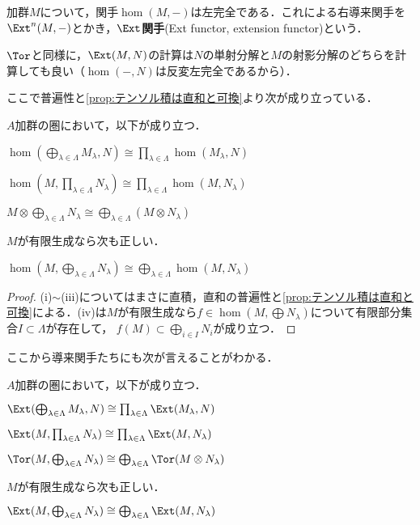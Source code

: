 \begin{defi}[$\Ext$関手]
	加群$M$について，関手$\hom(M,-)$は左完全である．これによる右導来関手を$\Ext^n(M,-)$とかき，$\Ext$\textbf{関手}(Ext functor, extension functor)という．
\end{defi}

$\Tor$と同様に，$\Ext(M,N)$の計算は$N$の単射分解と$M$の射影分解のどちらを計算しても良い（$\hom(-,N)$は反変左完全であるから）．

ここで普遍性と\ref{prop:テンソル積は直和と可換}より次が成り立っている．

\begin{prop}
	$A$加群の圏において，以下が成り立つ．
	\begin{sakura}
		\item $\hom(\bigoplus_{\lambda\in\Lambda} M_\lambda,N)\cong\prod_{\lambda\in\Lambda}\hom(M_\lambda,N)$
		\item $\hom(M,\prod_{\lambda\in\Lambda}N_\lambda)\cong\prod_{\lambda\in\Lambda}\hom(M,N_\lambda)$
		\item $M\otimes\bigoplus_{\lambda\in\Lambda}N_\lambda\cong\bigoplus_{\lambda\in\Lambda}(M\otimes N_\lambda)$
	\end{sakura}
	$M$が有限生成なら次も正しい．
	\begin{sakura}\setcounter{enumi}{3}
		\item $\hom(M,\bigoplus_{\lambda\in\Lambda}N_\lambda)\cong\bigoplus_{\lambda\in\Lambda}\hom(M,N_\lambda)$
	\end{sakura}
\end{prop}

\begin{proof}
	(i)$\sim$(iii)についてはまさに直積，直和の普遍性と\ref{prop:テンソル積は直和と可換}による．(iv)は$M$が有限生成なら$f\in\hom(M,\bigoplus N_\lambda)$について有限部分集合$I\subset\Lambda$が存在して， $f(M)\subset\bigoplus_{i\in I} N_i$が成り立つ．
\end{proof}

ここから導来関手たちにも次が言えることがわかる．

\begin{prop}
	$A$加群の圏において，以下が成り立つ．
	\begin{sakura}
		\item $\Ext(\bigoplus_{\lambda\in\Lambda} M_\lambda,N)\cong\prod_{\lambda\in\Lambda}\Ext(M_\lambda,N)$
		\item $\Ext(M,\prod_{\lambda\in\Lambda}N_\lambda)\cong\prod_{\lambda\in\Lambda}\Ext(M,N_\lambda)$
		\item $\Tor(M,\bigoplus_{\lambda\in\Lambda}N_\lambda)\cong\bigoplus_{\lambda\in\Lambda}\Tor(M\otimes N_\lambda)$
	\end{sakura}
	$M$が有限生成なら次も正しい．
	\begin{sakura}\setcounter{enumi}{3}
		\item $\Ext(M,\bigoplus_{\lambda\in\Lambda}N_\lambda)\cong\bigoplus_{\lambda\in\Lambda}\Ext(M,N_\lambda)$
	\end{sakura}
\end{prop}


